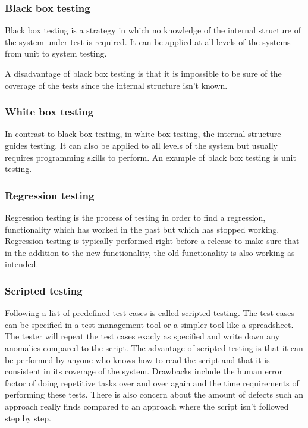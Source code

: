 \documentclass{article}
\begin{document}
			\subsubsection{Black box testing}
			Black box testing is a strategy in which no knowledge of the internal structure of the system under test is required. It can be applied at all levels of the systems from unit to system testing. 

			A disadvantage of black box testing is that it is impossible to be sure of the coverage of the tests since the internal structure isn't known.

			\subsubsection{White box testing}
			In contrast to black box testing, in white box testing, the internal structure guides testing. It can also be applied to all levels of the system but usually requires programming skills to perform. An example of black box testing is unit testing.

			\subsubsection{Regression testing}
			Regression testing is the process of testing in order to find a regression, functionality which has worked in the past but which has stopped working. Regression testing is typically performed right before a release to make sure that in the addition to the new functionality, the old functionality is also working as intended.
			
			\subsubsection{Scripted testing}
			Following a list of predefined test cases is called scripted testing. The test cases can be specified in a test management tool or a simpler tool like a spreadsheet. The tester will repeat the test cases exacly as specified and write down any anomalies compared to the script. 
			The advantage of scripted testing is that it can be performed by anyone who knows how to read the script and that it is consistent in its coverage of the system. 
			Drawbacks include the human error factor of doing repetitive tasks over and over again and the time requirements of performing these tests. There is also concern about the amount of defects such an approach really finds compared to an approach where the script isn't followed step by step. \cite{snakeoil} 
\end{document}
